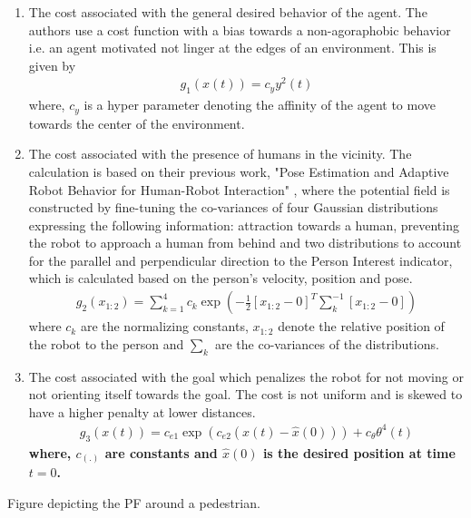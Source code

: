 \begin{enumerate}
	\item The cost associated with the general desired behavior of the agent. The authors use a cost function with a bias towards a non-agoraphobic behavior i.e. an agent motivated not linger at the edges of an environment. This is given by
	\begin{align}
	g_{1}(x(t)) = c_{y}y^{2}(t)
	\end{align}
	where, $c_y$ is a hyper parameter denoting the affinity of the agent to move towards the center of the environment.
	\item The cost associated with the presence of humans in the vicinity. The calculation is based on their previous work, "Pose Estimation and Adaptive Robot Behavior for Human-Robot Interaction" \cite{svenstrup_pose_estimation_2009}, where the potential field is constructed by fine-tuning the co-variances of four Gaussian distributions expressing the following information: attraction towards a human, preventing the robot to approach a human from behind and two distributions to account for the parallel and perpendicular direction to the Person Interest indicator, which is calculated based on the person's velocity, position and pose.  
	\begin{align}
	g_{2}(x_{1:2}) = \sum_{k=1}^{4}c_{k}\exp(-\frac{1}{2}[x_{1:2} - 0]^{T}\sum^{-1}_{k}[x_{1:2} - 0])
	\end{align} 
	where $c_{k}$ are the normalizing constants, $x_{1:2}$ denote the relative position of the robot to the person and $\sum_k$ are the co-variances of the distributions.
	\item The cost associated with the goal which penalizes the robot for not moving or not orienting itself towards the goal. The cost is not uniform and is skewed to have a higher penalty at lower distances.
	\begin{align}
	g_{3}(x(t)) = c_{e1}\exp(c_{e2}(x(t) - \hat{x}(0))) + c_{\theta}\theta^{4}(t)
	\end{align}
	\textbf{where, $c_{(.)}$ are constants and $\hat{x}(0)$ is the desired position at time $t=0$.}
\end{enumerate}

Figure depicting the PF around a pedestrian.

